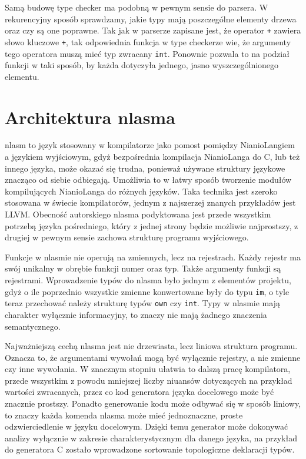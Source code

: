 \documentclass[licencjacka]{pracamgr}
\begin{document}
Samą budowę type checker ma podobną w pewnym sensie do parsera. W rekurencyjny sposób sprawdzamy, jakie typy mają poszczególne elementy drzewa oraz czy są one poprawne. Tak jak w parserze zapisane jest, że operator \texttt{+} zawiera słowo kluczowe \texttt{+}, tak odpowiednia funkcja w type checkerze wie, że argumenty tego operatora muszą mieć typ zwracany \texttt{int}. Ponownie pozwala to na podział funkcji w taki sposób, by każda dotyczyła jednego, jasno wyszczególnionego elementu.
\section{Architektura nlasma}
nlasm to język stosowany w kompilatorze jako pomost pomiędzy NianioLangiem a językiem wyjściowym, gdyż bezpośrednia kompilacja NianioLanga do C, lub też innego języka, może okazać się trudna, ponieważ używane struktury językowe znacząco od siebie odbiegają. Umożliwia to w łatwy sposób tworzenie modułów kompilujących NianioLanga do różnych języków. Taka technika jest szeroko stosowana w świecie kompilatorów, jednym z najszerzej znanych przykładów jest LLVM. Obecność autorskiego nlasma podyktowana jest przede wszystkim potrzebą języka pośredniego, który z jednej strony będzie możliwie najprostszy, z drugiej w pewnym sensie zachowa strukturę programu wyjściowego.

Funkcje w nlasmie nie operują na zmiennych, lecz na rejestrach. Każdy rejestr ma swój unikalny w obrębie funkcji numer oraz typ. Także argumenty funkcji są rejestrami. Wprowadzenie typów do nlasma było jednym z elementów projektu, gdyż o ile poprzednio wszystkie zmienne konwertowane były do typu \texttt{im}, o tyle teraz przechować należy strukturę typów \texttt{own} czy \texttt{int}. Typy w nlasmie mają charakter wyłącznie informacyjny, to znaczy nie mają żadnego znaczenia semantycznego.

Najważniejszą cechą nlasma jest nie drzewiasta, lecz liniowa struktura programu. Oznacza to, że argumentami wywołań mogą być wyłącznie rejestry, a nie zmienne czy inne wywołania. W znacznym stopniu ułatwia to dalszą pracę kompilatora, przede wszystkim z powodu mniejszej liczby niuansów dotyczących na przykład wartości zwracanych, przez co kod generatora języka docelowego może być znacznie prostszy. Ponadto generowanie kodu może odbywać się w sposób liniowy, to znaczy każda komenda nlasma może mieć jednoznaczne, proste odzwierciedlenie w języku docelowym. Dzięki temu generator może dokonywać analizy wyłącznie w zakresie charakterystycznym dla danego języka, na przykład do generatora C zostało wprowadzone sortowanie topologiczne deklaracji typów.
\end{document}
